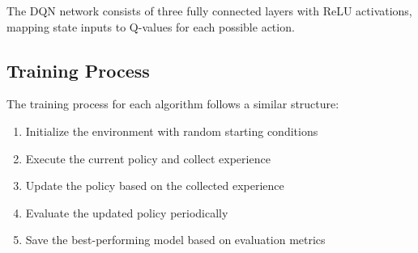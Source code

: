 \documentclass[12pt]{article}
\begin{document}
The DQN network consists of three fully connected layers with ReLU activations, mapping state inputs to Q-values for each possible action.


\subsection{Training Process}

The training process for each algorithm follows a similar structure:

    \begin{enumerate}
    \item Initialize the environment with random starting conditions
    \item Execute the current policy and collect experience
    \item Update the policy based on the collected experience
    \item Evaluate the updated policy periodically
    \item Save the best-performing model based on evaluation metrics
\end{enumerate}

\end{document}
